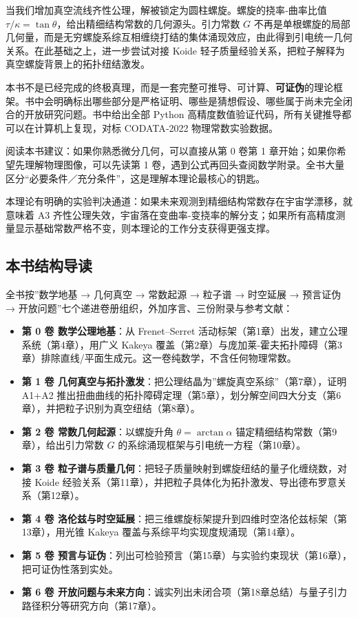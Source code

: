 当我们增加真空流线齐性公理，解被锁定为圆柱螺旋。螺旋的挠率‑曲率比值
\(\tau/\kappa=\tan\theta\)，给出精细结构常数的几何源头。引力常数 \(G\)
不再是单根螺旋的局部几何量，而是无穷螺旋系综互相缠绕打结的集体涌现效应，由此得到引电统一几何关系。在此基础之上，进一步尝试对接
Koide 轻子质量经验关系，把粒子解释为真空螺旋背景上的拓扑纽结激发。

本书不是已经完成的终极真理，而是一套完整可推导、可计算、\textbf{可证伪}的理论框架。书中会明确标出哪些部分是严格证明、哪些是猜想假设、哪些属于尚未完全闭合的开放研究问题。书中给出全部
Python 高精度数值验证代码，所有关键推导都可以在计算机上复现，对标
CODATA‑2022 物理常数实验数据。

阅读本书建议：如果你熟悉微分几何，可以直接从第 0 卷第 1
章开始；如果你希望先理解物理图像，可以先读第 1
卷，遇到公式再回头查阅数学附录。全书大量区分``必要条件／充分条件''，这是理解本理论最核心的钥匙。

本理论有明确的实验判决通道：如果未来观测到精细结构常数存在宇宙学漂移，就意味着
A3
齐性公理失效，宇宙落在变曲率‑变挠率的解分支；如果所有高精度测量显示基础常数严格不变，则本理论的工作分支获得更强支撑。

\subsection{本书结构导读}\label{ux672cux4e66ux7ed3ux6784ux5bfcux8bfb}

全书按''数学地基 → 几何真空 → 常数起源 → 粒子谱 → 时空延展 → 预言证伪 →
开放问题''七个递进卷册组织，外加序言、三份附录与参考文献：

\begin{itemize}
\tightlist
\item
  \textbf{第 0 卷 数学公理地基}：从 Frenet--Serret
  活动标架（第1章）出发，建立公理系统（第4章），用广义 Kakeya
  覆盖（第2章）与庞加莱‑霍夫拓扑障碍（第3章）排除直线/平面生成元。这一卷纯数学，不含任何物理常数。
\item
  \textbf{第 1 卷
  几何真空与拓扑激发}：把公理结晶为''螺旋真空系综''（第7章），证明 A1+A2
  推出扭曲曲线的拓扑障碍定理（第5章），划分解空间四大分支（第6章），并把粒子识别为真空纽结（第8章）。
\item
  \textbf{第 2 卷 常数几何起源}：以螺旋升角 \(\theta=\arctan\alpha\)
  锚定精细结构常数（第9章），给出引力常数 \(G\)
  的系综涌现框架与引电统一方程（第10章）。
\item
  \textbf{第 3 卷
  粒子谱与质量几何}：把轻子质量映射到螺旋纽结的量子化缠绕数，对接 Koide
  经验关系（第11章），并把粒子具体化为拓扑激发、导出德布罗意关系（第12章）。
\item
  \textbf{第 4 卷
  洛伦兹与时空延展}：把三维螺旋标架提升到四维时空洛伦兹标架（第13章），用光锥
  Kakeya 覆盖与系综平均实现度规涌现（第14章）。
\item
  \textbf{第 5 卷
  预言与证伪}：列出可检验预言（第15章）与实验约束现状（第16章），把可证伪性落到实处。
\item
  \textbf{第 6 卷
  开放问题与未来方向}：诚实列出未闭合项（第18章总结）与量子引力路径积分等研究方向（第17章）。
\end{itemize}

